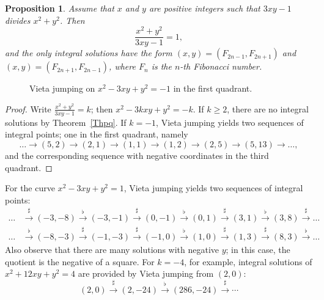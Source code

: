 \documentclass{amsart}
\newtheorem{prop}[lemma]{Proposition}
\newcommand{\lra}{\longrightarrow}
\newcommand{\lrs}{\stackrel{\sharp}{\lra}}
\newcommand{\lrf}{\stackrel{\flat}{\lra}}
\begin{document}
\begin{prop}
  Assume that $x$ and $y$ are positive integers such that
  $3xy-1$ divides $x^2 + y^2$. Then
  $$ \frac{x^2 + y^2}{3xy - 1} = 1, $$
  and the only integral solutions have the form
  $(x,y) = (F_{2n-1}, F_{2n+1})$ and $(x,y) = (F_{2n+1}, F_{2n-1})$,
  where $F_n$ is the $n$-th Fibonacci number.
\end{prop}


\begin{figure}
  \begin{center}
  \end{center}
  \caption{Vieta jumping on $x^2 - 3xy + y^2 = -1$ in the first quadrant.}
\end{figure}



\begin{proof}
  Write $ \frac{x^2 + y^2}{3xy - 1} = k$; then $x^2 - 3kxy + y^2 = -k$.
  If $k \ge 2$, there are no integral solutions by Theorem~\ref{Thpq}.
  If $k = -1$, Vieta jumping yields two sequences of integral points;
  one in the first quadrant, namely
  $$  \ldots \lra (5,2) \lra (2,1)  \lra  (1,1) \lra (1,2)
             \lra (2,5) \lra (5,13) \lra  \ldots, $$
  and the corresponding sequence with negative coordinates in the
  third quadrant.
\end{proof}


  

For the curve $x^2 - 3xy + y^2 = 1$, Vieta jumping yields two
sequences of integral points:
\begin{align*}
  {} \ldots & \lrs (-3,-8) \lrf (-3,-1) \lrs (0,-1) \lrf (0,1) \lrs (3,1)
           \lrf (3,8) \lrs \ldots \\
  {} \ldots & \lrf (-8,-3) \lrs (-1,-3) \lrs (-1,0) \lrf (1,0) \lrs (1,3)
           \lrs (8,3) \lrf \ldots 
\end{align*}
Also observe that there are many solutions with negative $y$; in this
case, the quotient is the negative of a square. For $k = -4$, for
example, integral solutions of $x^2 + 12xy + y^2 = 4$ are provided by
Vieta jumping from $(2,0)$:
$$ (2,0) \lrs (2,-24) \lrf (286,-24) \lrs \cdots $$
\end{document}
